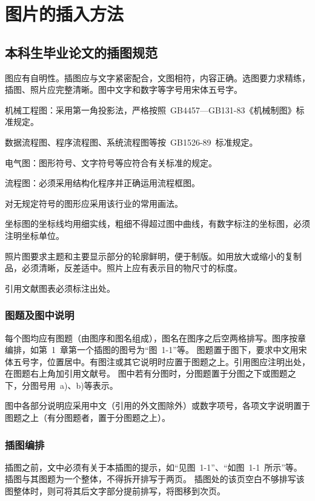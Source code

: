 
\chapter{图片的插入方法}

\section{本科生毕业论文的插图规范}

图应有自明性。插图应与文字紧密配合，文图相符，内容正确。选图要力求精练，插图、照片应完整清晰。图中文字和数字等字号用宋体五号字。

机械工程图：采用第一角投影法，严格按照~GB4457---GB131-83《机械制图》标准规定。

数据流程图、程序流程图、系统流程图等按~GB1526-89~标准规定。

电气图：图形符号、文字符号等应符合有关标准的规定。

流程图：必须采用结构化程序并正确运用流程框图。

对无规定符号的图形应采用该行业的常用画法。

坐标图的坐标线均用细实线，粗细不得超过图中曲线，有数字标注的坐标图，必须注明坐标单位。

照片图要求主题和主要显示部分的轮廓鲜明，便于制版。如用放大或缩小的复制品，必须清晰，反差适中。照片上应有表示目的物尺寸的标度。

引用文献图表必须标注出处。


\subsection{图题及图中说明}

每个图均应有图题（由图序和图名组成），图名在图序之后空两格排写。图序按章编排，如第~1~章第一个插图的图号为“图~1-1”等。
图题置于图下，要求中文用宋体五号字，位置居中。有图注或其它说明时应置于图题之上。引用图应注明出处，在图题右上角加引用文献号。
图中若有分图时，分图题置于分图之下或图题之下，分图号用~a)、b)等表示。

图中各部分说明应采用中文（引用的外文图除外）或数字项号，各项文字说明置于图题之上（有分图题者，置于分图题之上）。

\subsection{插图编排}
插图之前，文中必须有关于本插图的提示，如“见图~1-1”、“如图~1-1~所示”等。插图与其图题为一个整体，不得拆开排写于两页。
插图处的该页空白不够排写该图整体时，则可将其后文字部分提前排写，将图移到次页。

